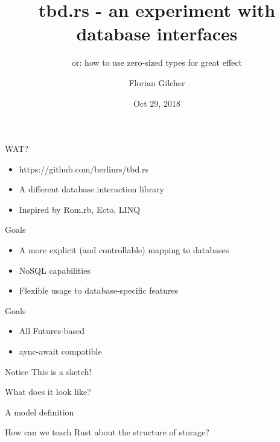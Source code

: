 \documentclass{beamer}
\title[tbd.rs - an experiment with database interfaces]
{tbd.rs - an experiment with database interfaces}
\subtitle[or: how to use zero-sized types for great effect]
{or: how to use zero-sized types for great effect}
\author 
{Florian Gilcher}
\institute
{
  CEO and Rust-Trainer\\
  Ferrous Systems GmbH }
\date
{Oct 29, 2018}
\begin{document}
\begin{frame}
  \titlepage
\end{frame}



\begin{frame}{WAT?}
  \begin{itemize}
    \item https://github.com/berlinrs/tbd.rs
    \item A different database interaction library
    \item Inspired by Rom.rb, Ecto, LINQ
  \end{itemize}
\end{frame}

\begin{frame}{Goals}
  \begin{itemize}
    \item A more explicit (and controllable) mapping to databases
    \item NoSQL capabilities
    \item Flexible usage to database-specific features
  \end{itemize}
\end{frame}

\begin{frame}{Goals}
  \begin{itemize}
    \item All Futures-based
    \item aync-await compatible
  \end{itemize}
\end{frame}

\begin{frame}{Notice}
  This is a sketch!
\end{frame}

\begin{frame}{What does it look like?}
\end{frame}

\begin{frame}{A model definition}
\end{frame}

\begin{frame}
  How can we teach Rust about the structure of storage?
\end{frame}
\end{document}
